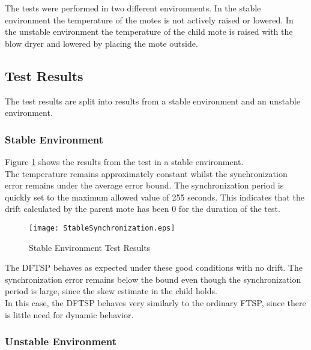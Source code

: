 \documentclass[Main]{subfiles}
\begin{document}
			The tests were performed in two different environments.
			In the stable environment the temperature of the motes is not actively raised or lowered.
			In the unstable environment the temperature of the child mote is raised with the blow dryer and lowered by placing the mote outside.
		
	

	\subsection{Test Results} %
	\label{sub:test_results}
		The test results are split into results from a stable environment and an unstable environment.  


		\subsubsection{Stable Environment} %
		\label{sub:stable_environment}
			
			
			Figure \ref{fig:stableSynchronization} shows the results from the test in a stable environment.
			\\The temperature remains approximately constant whilst the synchronization error remains under the average error bound.
			The synchronization period is quickly set to the maximum allowed value of 255 seconds. This indicates that the drift calculated by the parent mote has been 0 for the duration of the test.   

			\begin{figure}[H]
				\centering
				\texttt{[image: StableSynchronization.eps]}
				\caption{Stable Environment Test Results}
				\label{fig:stableSynchronization}
			\end{figure}

			The DFTSP behaves as expected under these good conditions with no drift. 
			The synchronization error remains below the bound even though the synchronization period is large, since the skew estimate in the child holds.
			\\ In this case, the DFTSP behaves very similarly to the ordinary FTSP, since there is little need for dynamic behavior. 



		\subsubsection{Unstable Environment} %
		\label{sub:unstable_environment}
			
\end{document}
